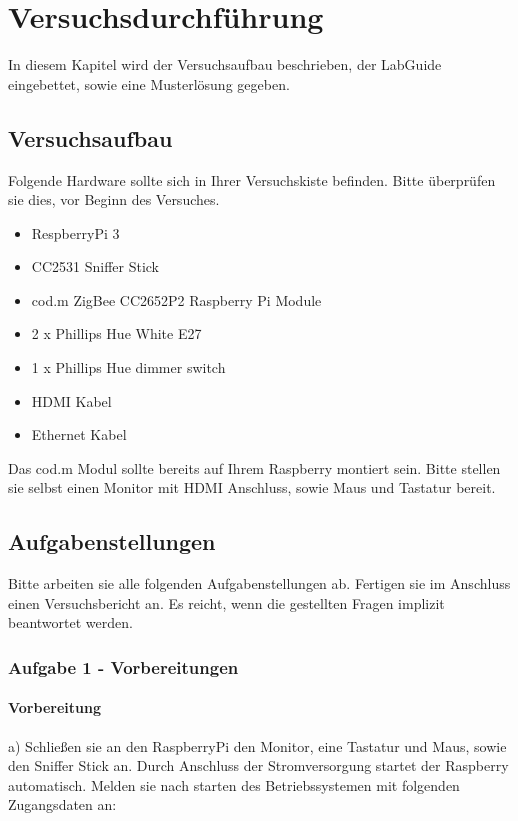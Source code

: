 \chapter{Versuchsdurchführung}

In diesem Kapitel wird der Versuchsaufbau beschrieben, der LabGuide eingebettet, sowie eine Musterlösung gegeben.

\section{Versuchsaufbau}

Folgende Hardware sollte sich in Ihrer Versuchskiste befinden. Bitte überprüfen sie dies, vor Beginn des Versuches.

\begin{itemize}
    \item RespberryPi 3
    \item CC2531 Sniffer Stick
    \item cod.m ZigBee CC2652P2 Raspberry Pi Module
    \item 2 x Phillips Hue White E27
    \item 1 x Phillips Hue dimmer switch
    \item HDMI Kabel
    \item Ethernet Kabel
\end{itemize}

Das cod.m Modul sollte bereits auf Ihrem Raspberry montiert sein. Bitte stellen sie selbst einen Monitor mit HDMI Anschluss, sowie Maus und Tastatur bereit.

\section{Aufgabenstellungen}

Bitte arbeiten sie alle folgenden Aufgabenstellungen ab. Fertigen sie im Anschluss einen Versuchsbericht an. Es reicht, wenn die gestellten Fragen
implizit beantwortet werden.

\subsection{Aufgabe 1 - Vorbereitungen}

\subsubsection{Vorbereitung}
a) Schließen sie an den RaspberryPi den Monitor, eine Tastatur und Maus, sowie den Sniffer Stick an. Durch Anschluss der
Stromversorgung startet der Raspberry automatisch. Melden sie nach starten des Betriebssystemen mit folgenden Zugangsdaten an:


